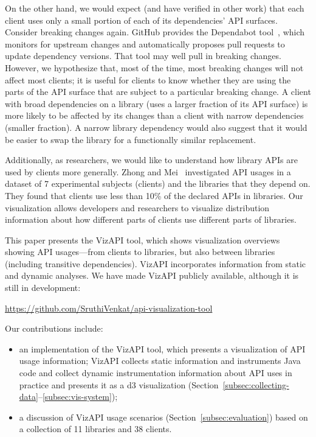 On the other hand, we would expect (and have verified in other work) that each client uses only a small portion of each of its dependencies' API surfaces. Consider breaking changes again. GitHub provides the Dependabot tool~\cite{mullans20:_keep_depen}, which monitors for upstream changes and automatically proposes pull requests to update dependency versions. That tool may well pull in breaking changes. However, we hypothesize that, most of the time, most breaking changes will not affect most clients; it is useful for clients to know whether they are using the parts of the API surface that are subject to a particular breaking change. A client with broad dependencies on a library (uses a larger fraction of its API surface) is more likely to be affected by its changes than a client with narrow dependencies (smaller fraction). A narrow library dependency would also suggest that it would be easier to swap the library for a functionally similar replacement.

Additionally, as researchers, we would like to understand how library
APIs are used by clients more generally. Zhong and
Mei~\cite{zhong19:_empir_study_api_usages} investigated API usages in
a dataset of 7 experimental subjects (clients) and the libraries that
they depend on.  They found that clients use less than 10\% of the
declared APIs in libraries. Our visualization allows developers and
researchers to visualize distribution information about how different
parts of clients use different parts of libraries.

This paper presents the VizAPI tool, which shows visualization overviews showing API usages---from clients to libraries, but also between libraries (including transitive dependencies). VizAPI incorporates information from static and dynamic analyses. 
We have made VizAPI publicly available, although it is still in development:
\begin{center}
\url{https://github.com/SruthiVenkat/api-visualization-tool}
\end{center}

Our contributions include:
\begin{itemize}
\item an implementation of the VizAPI tool, which presents a visualization of API usage information; VizAPI collects static information and instruments Java code and collect dynamic instrumentation information about API uses in practice and presents it as a d3 visualization (Section~\ref{subsec:collecting-data}--\ref{subsec:vis-system});
\item a discussion of VizAPI usage scenarios (Section~\ref{subsec:evaluation}) based on a collection of 11 libraries and 38 clients.
\end{itemize}


